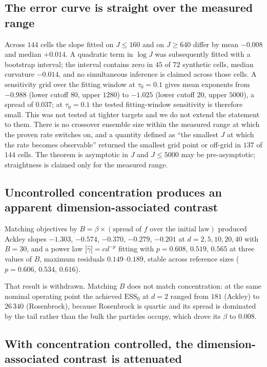 \documentclass[pdflatex,sn-mathphys-num]{sn-jnl}
\theoremstyle{thmstyleone}
\theoremstyle{thmstyletwo}
\theoremstyle{thmstylethree}
\begin{document}
\subsection{The error curve is straight over the measured range}\label{sec:straight}

Across $144$ cells the slope fitted on $J\le160$ and on $J\ge640$ differ by mean $-0.008$ and median $+0.014$. A quadratic term in $\log J$ was subsequently fitted with a bootstrap interval; the interval contains zero in $45$ of $72$ synthetic cells, median curvature $-0.014$, and no simultaneous inference is claimed across those cells. A sensitivity grid over the fitting window at $\tau_0=0.1$ gives mean exponents from $-0.988$ (lower cutoff $80$, upper $1280$) to $-1.025$ (lower cutoff $20$, upper $5000$), a spread of $0.037$; at $\tau_0=0.1$ the tested fitting-window sensitivity is therefore small. This was not tested at tighter targets and we do not extend the statement to them. There is no crossover ensemble size within the measured range at which the proven rate switches on, and a quantity defined as ``the smallest $J$ at which the rate becomes observable'' returned the smallest grid point or off-grid in $137$ of $144$ cells. The theorem is asymptotic in $J$ and $J\le5000$ may be pre-asymptotic; straightness is claimed only for the measured range.

\subsection{Uncontrolled concentration produces an apparent dimension-associated contrast}\label{sec:withdrawn1}

Matching objectives by $B=\beta\times(\text{spread of }f\text{ over the initial law})$ produced Ackley slopes $-1.303$, $-0.574$, $-0.370$, $-0.279$, $-0.201$ at $d=2,5,10,20,40$ with $B=30$, and a power law $|\hat\gamma|=cd^{-p}$ fitting with $p=0.608$, $0.519$, $0.565$ at three values of $B$, maximum residuals $0.149$--$0.189$, stable across reference sizes ($p=0.606$, $0.534$, $0.616$).

That result is withdrawn. Matching $B$ does not match concentration: at the same nominal operating point the achieved $\mathrm{ESS}_0$ at $d=2$ ranged from $181$ (Ackley) to $26\,340$ (Rosenbrock), because Rosenbrock is quartic and its spread is dominated by the tail rather than the bulk the particles occupy, which drove its $\beta$ to $0.008$.

\subsection{With concentration controlled, the dimension-associated contrast is attenuated}\label{sec:mech}
\end{document}
